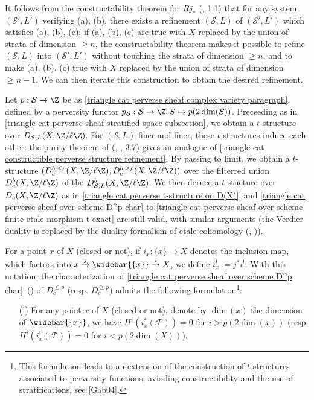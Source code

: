 It follows from the constructability theorem for $Rj_*$ (\cite{*}, 1.1) that for any system $(\mathcal{S}',L')$ verifying (a), (b), there exists a refinement $(\mathcal{S},L)$ of $(\mathcal{S}',L')$ which satisfies (a), (b), (c): if (a), (b), (c) are true with $X$ replaced by the union of strata of dimension $\geq n$, the constructability theorem makes it possible to refine $(\mathcal{S},L)$ into $(\mathcal{S}',L')$ without touching the strata of dimension $\geq n$, and to make (a), (b), (c) true with $X$ replaced by the union of strata of dimension $\geq n-1$. We can then iterate this construction to obtain the desired refinement.\par

Let $p:\mathcal{S}\to\Z$ be as \ref{triangle cat perverse sheaf complex variety paragraph}, defined by a perversity functor $p_\mathcal{S}:\mathcal{S}\to\Z, S\mapsto p(2\dim(S))$. Preceeding as in \autoref{triangle cat perverse sheaf stratified space subsection}, we obtain a $t$-structure over $D_{\mathcal{S},L}(X,\Z/\ell\Z)$. For $(\mathcal{S},L)$ finer and finer, these $t$-structures induce each other: the purity theorem of (\cite{SGA4-3}, , 3.7) gives an analogue of \cref{triangle cat constructible perverse structure refinement}. By passing to limit, we obtain a $t$-structure $(D_c^{b,\leq p}(X,\Z/\ell\Z),D_c^{b,\geq p}(X,\Z/\ell\Z))$ over the filterred union $D_c^b(X,\Z/\ell\Z)$ of the $D_{\mathcal{S},L}^b(X,\Z/\ell\Z)$. We then deruce a $t$-stucture over $D_c(X,\Z/\ell\Z)$ as in \cref{triangle cat perverse t-structure on D(X)}, and \cref{triangle cat perverse sheaf over scheme D^p char} to \cref{triangle cat perverse sheaf over scheme finite etale morphism t-exact} are still valid, with similar arguments (the Verdier duality is replaced by the duality formalism of etale cohomology (\cite{SGA4-3}, )).\par
For a point $x$ of $X$ (closed or not), if $i_x:\{x\}\to X$ denotes the inclusion map, which factors into $x\stackrel{j}{\to}\widebar{\{x\}}\stackrel{i}{\to}X$, we define $i_x^!:=j^*i^!$. With this notation, the characterization of \cref{triangle cat perverse sheaf over scheme D^p char}~() of $D_c^{\leq p}$ (resp. $D_c^{\geq p}$) admits the following formulation\footnote{This formulation leads to an extension of the construction of $t$-structures associated to perversity functions, avioding constructibility and the use of stratifications, see [Gab04].}:
\begin{enumerate}
    \item[(\rmnum{2}')] For any point $x$ of $X$ (closed or not), denote by $\dim(x)$ the dimension of $\widebar{\{x\}}$, we have $H^i(i_x^*(\mathscr{F}))=0$ for $i>p(2\dim(x))$ (resp. $H^i(i_x^!(\mathscr{F}))=0$ for $i<p(2\dim(X))$). 
\end{enumerate}

